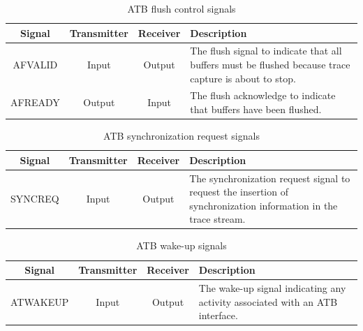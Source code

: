 \begin{table}[H]
    \centering 
    \begin{tabularx}{\textwidth}{|c|c|c|>{\centering\arraybackslash}X|}
        \hline
        Signal  & Transmitter   & Receiver  & Description \\ \hline
        AFVALID & Input         & Output    & The flush signal to indicate that all buffers must 
                                              be flushed because trace capture is about to stop. \\ \hline
        AFREADY & Output        & Input     & The flush acknowledge to indicate that buffers have 
                                              been flushed. \\ \hline
    \end{tabularx}
    \caption{ATB flush control signals} 
    \label{tab:flush_control_signals}
\end{table}

\begin{table}[H]
    \centering 
    \begin{tabularx}{\textwidth}{|c|c|c|>{\centering\arraybackslash}X|}
        \hline
        Signal  & Transmitter   & Receiver  & Description \\ \hline
        SYNCREQ & Input         & Output    & The synchronization request signal to request the 
                                              insertion of synchronization information in the 
                                              trace stream. \\ \hline
    \end{tabularx}
    \caption{ATB synchronization request signals} 
    \label{tab:synchronization_signals}
\end{table}

\begin{table}[H]
    \centering 
    \begin{tabularx}{\textwidth}{|c|c|c|>{\centering\arraybackslash}X|}
        \hline
        Signal      & Transmitter   & Receiver  & Description \\ \hline
        ATWAKEUP    & Input         & Output    & The wake-up signal indicating any activity 
                                                  associated with an ATB interface. \\ \hline
    \end{tabularx}
    \caption{ATB wake-up signals} 
    \label{tab:wake-up_signals}
\end{table}

